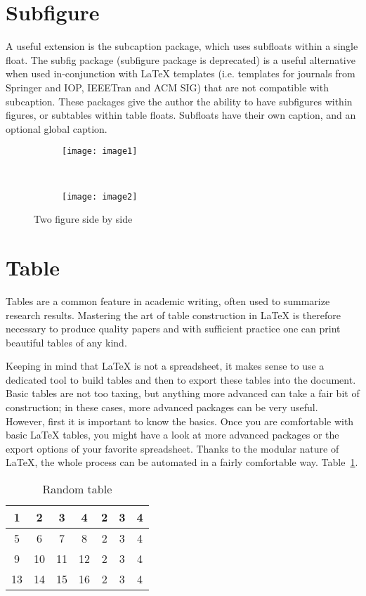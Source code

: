 \section{Subfigure}
A useful extension is the subcaption package, which uses subfloats within a single float. The subfig package (subfigure package is deprecated) is a useful alternative when used in-conjunction with LaTeX templates (i.e. templates for journals from Springer and IOP, IEEETran and ACM SIG) that are not compatible with subcaption. These packages give the author the ability to have subfigures within figures, or subtables within table floats. Subfloats have their own caption, and an optional global caption.

\begin{figure}
\centering
\begin{subfigure}[b]{0.45\textwidth}
  \centering
  \texttt{[image: image1]}
  \caption{}
  \label{fig:im1}
 \end{subfigure}
~
\begin{subfigure}[b]{0.45\textwidth}
  \centering
  \texttt{[image: image2]}
  \caption{}
  \label{fig:im2}
\end{subfigure}
\caption{Two figure side by side}
\label{fig:subfigs cap}
\end{figure}

\section{Table}
Tables are a common feature in academic writing, often used to summarize research results. Mastering the art of table construction in LaTeX is therefore necessary to produce quality papers and with sufficient practice one can print beautiful tables of any kind.

Keeping in mind that LaTeX is not a spreadsheet, it makes sense to use a dedicated tool to build tables and then to export these tables into the document. Basic tables are not too taxing, but anything more advanced can take a fair bit of construction; in these cases, more advanced packages can be very useful. However, first it is important to know the basics. Once you are comfortable with basic LaTeX tables, you might have a look at more advanced packages or the export options of your favorite spreadsheet. Thanks to the modular nature of LaTeX, the whole process can be automated in a fairly comfortable way. Table~\ref{tab: sample}.

\begin{table}
\centering
\caption{Random table}
\label{tab: sample}
\begin{tabular}{|c|c|c|c|c|c|c|}
\hline 
1 & 2 & 3 & 4 & 2 & 3 & 4 \\ \hline 
5 & 6 & 7 & 8 & 2 & 3 & 4 \\ \hline 
9 & 10 & 11 & 12 & 2 & 3 & 4\\ \hline 
13 & 14 & 15 & 16 & 2 & 3 & 4\\ \hline 
\end{tabular} 
\end{table}









